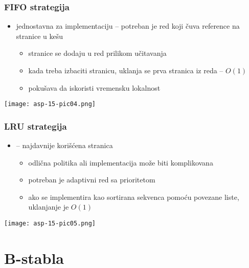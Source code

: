 \documentclass[compress,aspectratio=169]{beamer}
\begin{document}
\begin{frame}[fragile]
  \frametitle{FIFO strategija}
  \begin{itemize}
    \item jednostavna za implementaciju -- potreban je red koji čuva 
    reference na stranice u kešu
    \begin{itemize}
      \item stranice se dodaju u red prilikom učitavanja
      \item kada treba izbaciti stranicu, uklanja se prva stranica iz 
      reda -- $O(1)$
      \item pokušava da iskoristi vremensku lokalnost
    \end{itemize}
  \end{itemize}
  \begin{center}
    \texttt{[image: asp-15-pic04.png]}
  \end{center}
\end{frame}

\begin{frame}[fragile]
  \frametitle{LRU strategija}
  \begin{itemize}
    \item {} -- najdavnije korišćena stranica
    \begin{itemize}
      \item odlična politika ali implementacija može biti komplikovana
      \item potreban je adaptivni red sa prioritetom
      \item ako se implementira kao sortirana sekvenca pomoću povezane
      liste, uklanjanje je $O(1)$
    \end{itemize}
  \end{itemize}
  \begin{center}
    \texttt{[image: asp-15-pic05.png]}
  \end{center}
\end{frame}

\section[B-stabla]{B-stabla}
\end{document}
